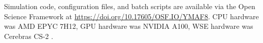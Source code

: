 


Simulation code, configuration files, and batch scripts are available via the Open Science Framework at \url{https://doi.org/10.17605/OSF.IO/YMAF8}.
CPU hardware was AMD EPYC 7H12, GPU hardware was NVIDIA A100, WSE hardware was Cerebras CS-2 \citep{buitrago2021neocortex,Brashear2025}.

